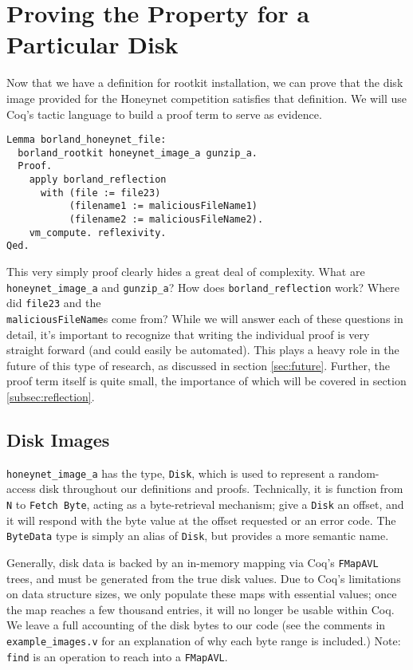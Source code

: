 \documentclass[nocopyrightspace]{sigplanconf}
\begin{document}
\section{Proving the Property for a Particular Disk}
\label{sec:proving}

Now that we have a definition for rootkit installation, we can prove that the
disk image provided for the Honeynet competition satisfies that definition. We
will use Coq's tactic language to build a proof term to serve as evidence.

\begin{lstlisting}
Lemma borland_honeynet_file:
  borland_rootkit honeynet_image_a gunzip_a.
  Proof.
    apply borland_reflection 
      with (file := file23) 
           (filename1 := maliciousFileName1) 
           (filename2 := maliciousFileName2).
    vm_compute. reflexivity.
Qed.
\end{lstlisting}

This very simply proof clearly hides a great deal of complexity. What are {\tt
honeynet\_image\_a} and {\tt gunzip\_a}? How does {\tt borland\_reflection}
work? Where did {\tt file23} and the \\{\tt maliciousFileName}s come from?
While we will answer each of these questions in detail, it's important to
recognize that writing the individual proof is very straight forward (and
could easily be automated). This plays a heavy role in the future of this type
of research, as discussed in section \ref{sec:future}. Further, the proof term
itself is quite small, the importance of which will be covered in section
\ref{subsec:reflection}.

\subsection{Disk Images}

{\tt honeynet\_image\_a} has the type, {\tt Disk}, which is used to represent
a random-access disk throughout our definitions and proofs.  Technically, it
is function from {\tt N} to {\tt Fetch Byte}, acting as a byte-retrieval
mechanism; give a {\tt Disk} an offset, and it will respond with the byte
value at the offset requested or an error code. The {\tt ByteData} type is
simply an alias of {\tt Disk}, but provides a more semantic name.

Generally, disk data is backed by an in-memory mapping via Coq's {\tt FMapAVL}
trees, and must be generated from the true disk values. Due to Coq's
limitations on data structure sizes, we only populate these maps with
essential values; once the map reaches a few thousand entries, it will no
longer be usable within Coq. We leave a full accounting of the disk bytes to
our code (see the comments in {\tt example\_images.v} for an explanation of
why each byte range is included.) Note: {\tt find} is an operation to reach
into a {\tt FMapAVL}.
\end{document}
